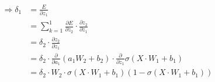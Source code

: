 \begin{align*}    
\Rightarrow \delta_{1} &= \frac{E}{\partial z_{1}}\\
&= \sum_{k=1}^{1} \frac{\partial E}{\partial z_{2}}\cdot \frac{\partial z_{2}}{\partial z_{1}}\\
&=  \delta_{2} \cdot \frac{\partial z_{2}}{\partial z_{1}}\\
&=  \delta_{2}\cdot \frac{\partial }{\partial a_{1}}(a_{1}W_{2}+b_{2})\cdot \frac{\partial }{\partial z_{1}}\sigma(X\cdot W_{1} +b_{1})\\
&=  \delta_{2}\cdot W_{2} \cdot \sigma(X\cdot W_{1}+b_{1})(1- \sigma(X\cdot W_{1}+b_{1}))\\
\end{align*}
